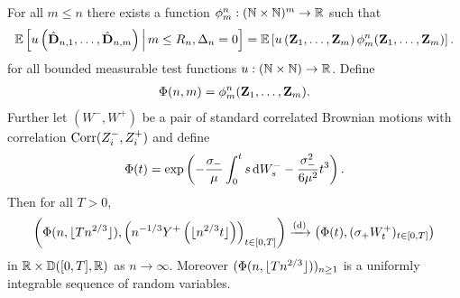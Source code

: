 \begin{lemma}
    \label{lem:measure-change}
    For all $m \leq n$ there exists a function $\phi^n_m: ({\mathbb N} \times {\mathbb N})^m \to {\mathbb R}$ such that 
    \begin{equation*}
        {\mathbb E}\left[ 
            u\left( 
                \hat{{\mathbf D}}_{n, 1}, \ldots, \hat{{\mathbf D}}_{n, m}
             \right) 
             \,\middle\vert\,
             m \leq R_n, \Delta_n = 0
         \right]
        =
        {\mathbb E}\left[ 
            u\left( 
                {\mathbf Z}_1, \ldots, {\mathbf Z}_m
             \right)
             \phi^n_m({\mathbf Z}_1, \ldots, {\mathbf Z}_m)
         \right].
    \end{equation*}
    for all bounded measurable test functions $u: ({\mathbb N} \times {\mathbb N}) \to {\mathbb R}$. Define
    \begin{align*}
        \Phi(n, m) = \phi^n_m({\mathbf Z}_1, \ldots, {\mathbf Z}_m).
    \end{align*}
    Further let $(W^-, W^+)$ be a pair of standard correlated Brownian motions with correlation $\operatorname{Corr}(Z^-_i, Z^+_i)$ and define
    \begin{equation*}
        \Phi(t) = \exp \left( 
            - \frac{\sigma_-}{\mu} \int_0^t s \mathop{}\!\mathrm{d} W^-_s - \frac{\sigma_-^2}{6 \mu^2} t^3
         \right).
    \end{equation*}
    Then for all $T > 0$,
    \begin{equation*}
        \left( 
            \Phi(n, \lfloor T n^{2/3}\rfloor), \left( n^{-1/3} Y^+\left( \lfloor n^{2/3} t\rfloor \right) \right)_{t \in [0, T]}
        \right)
        \xrightarrow[]{\mathrm{(d)}}
        \left( 
            \Phi(t),
            (\sigma_+ W^+_t)_{t \in [0, T]}
        \right)
    \end{equation*}
    in ${\mathbb R} \times {\mathbb D}([0, T], {\mathbb R})$ as $n \to \infty$. Moreover $(\Phi(n, \lfloor T n^{2/3}\rfloor))_{n \geq 1}$ is a uniformly integrable sequence of random variables.
\end{lemma}